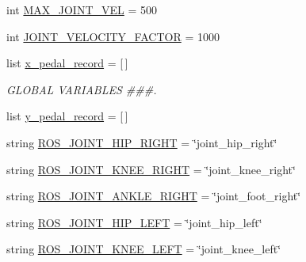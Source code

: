 \begin{DoxyCompactItemize}
\item 
int \mbox{\hyperlink{namespacepedal__simulation__interpolation__linear__trajectory__points_afb48b713f436f5b50e00b59a37610c09}{M\+A\+X\+\_\+\+J\+O\+I\+N\+T\+\_\+\+V\+EL}} = 500
\item 
int \mbox{\hyperlink{namespacepedal__simulation__interpolation__linear__trajectory__points_a72b8165cb2dcdd6b1dbe58492d1dbbd0}{J\+O\+I\+N\+T\+\_\+\+V\+E\+L\+O\+C\+I\+T\+Y\+\_\+\+F\+A\+C\+T\+OR}} = 1000
\item 
list \mbox{\hyperlink{namespacepedal__simulation__interpolation__linear__trajectory__points_a518247061f2b34486d78160c6ce3c9ae}{x\+\_\+pedal\+\_\+record}} = \mbox{[}$\,$\mbox{]}
\begin{DoxyCompactList}\small\item\em G\+L\+O\+B\+AL V\+A\+R\+I\+A\+B\+L\+ES \#\#\#. \end{DoxyCompactList}\item 
list \mbox{\hyperlink{namespacepedal__simulation__interpolation__linear__trajectory__points_a8c7cde143a0538002a53439ae50296a4}{y\+\_\+pedal\+\_\+record}} = \mbox{[}$\,$\mbox{]}
\item 
string \mbox{\hyperlink{namespacepedal__simulation__interpolation__linear__trajectory__points_a073eb93be3570097fd140f4488393467}{R\+O\+S\+\_\+\+J\+O\+I\+N\+T\+\_\+\+H\+I\+P\+\_\+\+R\+I\+G\+HT}} = \char`\"{}joint\+\_\+hip\+\_\+right\char`\"{}
\item 
string \mbox{\hyperlink{namespacepedal__simulation__interpolation__linear__trajectory__points_af1c84f3b73df0161dd11c10d2faa4112}{R\+O\+S\+\_\+\+J\+O\+I\+N\+T\+\_\+\+K\+N\+E\+E\+\_\+\+R\+I\+G\+HT}} = \char`\"{}joint\+\_\+knee\+\_\+right\char`\"{}
\item 
string \mbox{\hyperlink{namespacepedal__simulation__interpolation__linear__trajectory__points_a593c7b6f49b5c4ba041aa3efe609fb75}{R\+O\+S\+\_\+\+J\+O\+I\+N\+T\+\_\+\+A\+N\+K\+L\+E\+\_\+\+R\+I\+G\+HT}} = \char`\"{}joint\+\_\+foot\+\_\+right\char`\"{}
\item 
string \mbox{\hyperlink{namespacepedal__simulation__interpolation__linear__trajectory__points_a4134acdea8d46c49c3031087a5dfa459}{R\+O\+S\+\_\+\+J\+O\+I\+N\+T\+\_\+\+H\+I\+P\+\_\+\+L\+E\+FT}} = \char`\"{}joint\+\_\+hip\+\_\+left\char`\"{}
\item 
string \mbox{\hyperlink{namespacepedal__simulation__interpolation__linear__trajectory__points_a0e2787b945854e034b47dec8918298f2}{R\+O\+S\+\_\+\+J\+O\+I\+N\+T\+\_\+\+K\+N\+E\+E\+\_\+\+L\+E\+FT}} = \char`\"{}joint\+\_\+knee\+\_\+left\char`\"{}
\item 

\end{DoxyCompactItemize}
